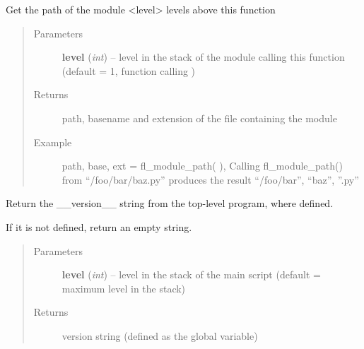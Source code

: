 \documentclass[letterpaper,10pt,english]{sphinxmanual}
\begin{document}

\begin{fulllineitems}
\label{docs/utilities:utilities.files.fl_module_path}
Get the path of the module \textless{}level\textgreater{} levels above this function
\begin{quote}\begin{description}
\item[{Parameters}] \leavevmode
\textbf{level} (\emph{int}) -- level in the stack of the module calling this function
(default = 1, function calling )

\item[{Returns}] \leavevmode
path, basename and extension of the file containing the module

\item[{Example }] \leavevmode
path, base, ext = fl\_module\_path( ), Calling fl\_module\_path() from
``/foo/bar/baz.py'' produces the result ``/foo/bar'', ``baz'', ''.py''

\end{description}\end{quote}

\end{fulllineitems}



\begin{fulllineitems}
\label{docs/utilities:utilities.files.fl_program_version}
Return the \_\_version\_\_ string from the top-level program, where defined.

If it is not defined, return an empty string.
\begin{quote}\begin{description}
\item[{Parameters}] \leavevmode
\textbf{level} (\emph{int}) -- level in the stack of the main script
(default = maximum level in the stack)

\item[{Returns}] \leavevmode
version string (defined as the  global variable)

\end{description}\end{quote}

\end{fulllineitems}
\end{document}
